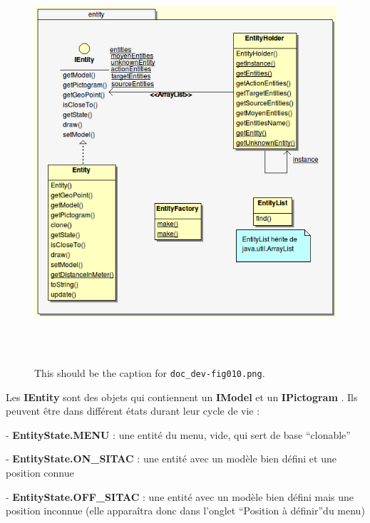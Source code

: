 \documentclass{article}
\begin{document}
\begin{figure}[htbp]
\begin{center}
\includegraphics[width=410pt, height=424pt]{doc_dev-fig010.png}
\caption{This should be the caption for \texttt{doc\_dev-fig010.png}.}
\end{center}
\end{figure}

\vspace{13pt}
{\color{color01} Les }{\color{color01} \textbf{IEntity}}{\color{color01}  sont 
des objets qui contiennent un }{\color{color01} \textbf{IModel }}{\color{color01} et 
un }{\color{color01} \textbf{IPictogram}}{\color{color01} . Ils peuvent être dans 
différent états durant leur cycle de vie :}

\leftskip=36pt
{\color{color01} - }{\color{color01} \textbf{EntityState.MENU}}{\color{color01} : 
une entité du menu, vide, qui sert de base ``clonable''}

{\color{color01} - }{\color{color01} \textbf{EntityState.ON\_SITAC}}{\color{color01} : 
une entité avec un modèle bien défini et une position connue}

{\color{color01} - }{\color{color01} \textbf{EntityState.OFF\_SITAC}}{\color{color01} : 
une entité avec un modèle bien défini mais une position inconnue (elle apparaîtra 
donc dans l'onglet ``Position à définir''du menu)\label{h.h2unrh8mgexo}}
\end{document}
